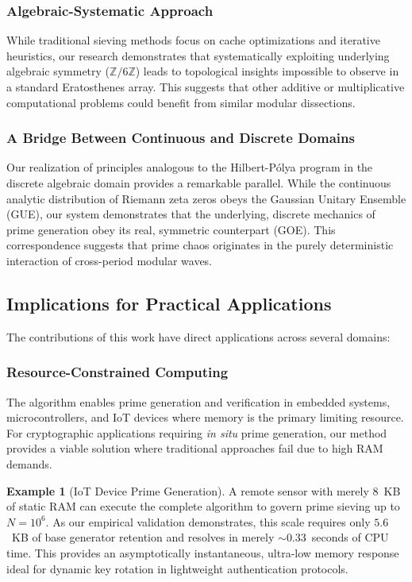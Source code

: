 \documentclass{article}
\numberwithin{equation}{section}
\theoremstyle{plain}
\theoremstyle{definition}
\newtheorem{example}[theorem]{Example}
\begin{document}
\subsubsection{Algebraic-Systematic Approach}

While traditional sieving methods focus on cache optimizations and iterative heuristics, our research demonstrates that systematically exploiting underlying algebraic symmetry ($\mathbb{Z}/6\mathbb{Z}$) leads to topological insights impossible to observe in a standard Eratosthenes array. This suggests that other additive or multiplicative computational problems could benefit from similar modular dissections.

\subsubsection{A Bridge Between Continuous and Discrete Domains}

Our realization of principles analogous to the Hilbert-Pólya program in the discrete algebraic domain provides a remarkable parallel. While the continuous analytic distribution of Riemann zeta zeros obeys the Gaussian Unitary Ensemble (GUE), our system demonstrates that the underlying, discrete mechanics of prime generation obey its real, symmetric counterpart (GOE). This correspondence suggests that prime chaos originates in the purely deterministic interaction of cross-period modular waves.

\subsection{Implications for Practical Applications}

The contributions of this work have direct applications across several domains:

\subsubsection{Resource-Constrained Computing}

The algorithm enables prime generation and verification in embedded systems, microcontrollers, and IoT devices where memory is the primary limiting resource. For cryptographic applications requiring \textit{in situ} prime generation, our method provides a viable solution where traditional approaches fail due to high RAM demands.

\begin{example}[IoT Device Prime Generation]
A remote sensor with merely $8$~KB of static RAM can execute the complete algorithm to govern prime sieving up to $N = 10^6$. As our empirical validation demonstrates, this scale requires only $5.6$~KB of base generator retention and resolves in merely $\sim 0.33$~seconds of CPU time. This provides an asymptotically instantaneous, ultra-low memory response ideal for dynamic key rotation in lightweight authentication protocols.
\end{example}
\end{document}
